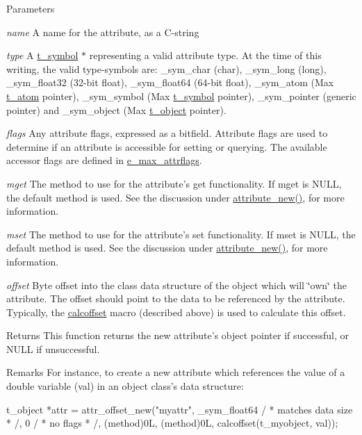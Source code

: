 \begin{DoxyParams}{Parameters}
\item[{\em name}]A name for the attribute, as a C-\/string \item[{\em type}]A \hyperlink{structt__symbol}{t\_\-symbol} $\ast$ representing a valid attribute type. At the time of this writing, the valid type-\/symbols are: {\ttfamily \_\-sym\_\-char} (char), {\ttfamily \_\-sym\_\-long} (long), {\ttfamily \_\-sym\_\-float32} (32-\/bit float), {\ttfamily \_\-sym\_\-float64} (64-\/bit float), {\ttfamily \_\-sym\_\-atom} (Max \hyperlink{structt__atom}{t\_\-atom} pointer), {\ttfamily \_\-sym\_\-symbol} (Max \hyperlink{structt__symbol}{t\_\-symbol} pointer), {\ttfamily \_\-sym\_\-pointer} (generic pointer) and {\ttfamily \_\-sym\_\-object} (Max \hyperlink{structt__object}{t\_\-object} pointer). \item[{\em flags}]Any attribute flags, expressed as a bitfield. Attribute flags are used to determine if an attribute is accessible for setting or querying. The available accessor flags are defined in \hyperlink{group__attr_gaf296cfc6741bb19207f6ed8062809115}{e\_\-max\_\-attrflags}. \item[{\em mget}]The method to use for the attribute's {\ttfamily get} functionality. If {\ttfamily mget} is NULL, the default method is used. See the discussion under \hyperlink{group__attr_ga24badeb31a79d844935b2a1c8423c905}{attribute\_\-new()}, for more information. \item[{\em mset}]The method to use for the attribute's {\ttfamily set} functionality. If {\ttfamily mset} is NULL, the default method is used. See the discussion under \hyperlink{group__attr_ga24badeb31a79d844935b2a1c8423c905}{attribute\_\-new()}, for more information. \item[{\em offset}]Byte offset into the class data structure of the object which will \char`\"{}own\char`\"{} the attribute. The offset should point to the data to be referenced by the attribute. Typically, the \hyperlink{group__misc_gaad95899dfbc7b5b8fe11921643ef46f0}{calcoffset} macro (described above) is used to calculate this offset.\end{DoxyParams}
\begin{DoxyReturn}{Returns}
This function returns the new attribute's object pointer if successful, or NULL if unsuccessful.
\end{DoxyReturn}
\begin{DoxyRemark}{Remarks}
For instance, to create a new attribute which references the value of a double variable ({\ttfamily val}) in an object class's data structure: 
\begin{DoxyCode}
    t_object *attr = attr_offset_new("myattr", _sym_float64 / * matches data size
       * /, 0 / * no flags * /, (method)0L, (method)0L, calcoffset(t_myobject, val));
\end{DoxyCode}
 
\end{DoxyRemark}
